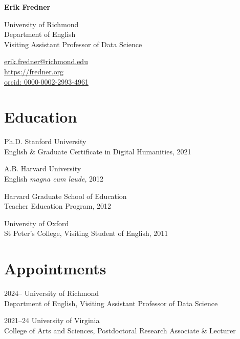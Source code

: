\documentclass[12pt,letterpaper]{report}
\newcommand{\myname}{Erik Fredner}
\newcommand{\namefont}[1]{{\normalfont\bfseries\Huge{#1}}}
\begin{document}
\raggedright{}

\namefont{\myname}

\vspace{1em}
\begin{minipage}[t]{0.700\textwidth}
	University of Richmond\\
	Department of English\\
	Visiting Assistant Professor of Data Science
\end{minipage}
\begin{minipage}[t]{0.295\textwidth}
	\flushright{}
	\href{mailto:erik.fredner@richmond.edu}{erik.fredner@richmond.edu} \\
	\href{https://fredner.org}{https://fredner.org} \\
	\href{https://orcid.org/0000-0002-2993-4961}{orcid: 0000-0002-2993-4961}
\end{minipage}

\section*{Education}

\begin{tablist}
	\item[Ph.D.] \tab{}Stanford University\\
	English \& Graduate Certificate in Digital Humanities, 2021\\
	\item[A.B.]  \tab{}Harvard University\\
	English \textit{magna cum laude}, 2012
	\item[] \tab{}Harvard Graduate School of Education\\
	Teacher Education Program, 2012
	\item[] \tab{}University of Oxford\\
	St Peter's College, Visiting Student of English, 2011
\end{tablist}

\section*{Appointments}

\begin{tablist}
	\item[2024--]   \tab{}University of Richmond\\
	Department of English, Visiting Assistant Professor of Data Science
	\item[2021--24] \tab{}University of Virginia\\
	College of Arts and Sciences, Postdoctoral Research Associate \& Lecturer
\end{tablist}
\end{document}

